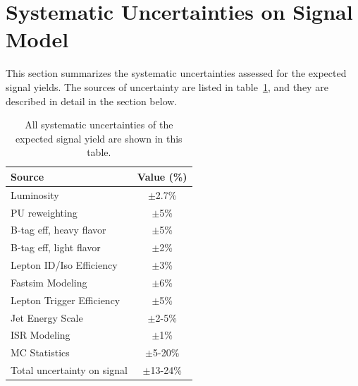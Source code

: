 \clearpage

\section{Systematic Uncertainties on Signal Model}

This section summarizes the systematic uncertainties assessed for the expected signal yields.
The sources of uncertainty are listed in table~\ref{tab:syst}, and they are described in detail in the section below.

\begin{table}[htb]
  \begin{center}
    \footnotesize
    \caption{
      \label{tab:syst}
      All systematic uncertainties of the expected signal yield are shown in this table.
    }
    \begin{tabular}{l|c}
      \hline
      \hline
      Source                     & Value (\%) \\
      \hline
      Luminosity                 & $\pm$2.7\%  \\
      PU reweighting             & $\pm$5\%    \\
      B-tag eff, heavy flavor    & $\pm$5\%    \\
      B-tag eff, light flavor    & $\pm$2\%    \\
      Lepton ID/Iso Efficiency   & $\pm$3\%    \\
      Fastsim Modeling           & $\pm$6\%    \\
      Lepton Trigger Efficiency  & $\pm$5\%    \\
      Jet Energy Scale           & $\pm$2-5\%  \\
      ISR Modeling               & $\pm$1\%    \\
      MC Statistics              & $\pm$5-20\% \\
      \hline
      Total uncertainty on signal& $\pm$13-24\% \\
      \hline
      \hline
    \end{tabular}
  \end{center}
\end{table}

